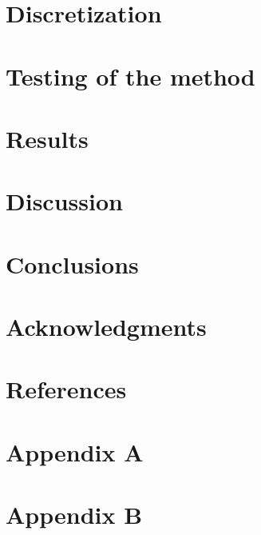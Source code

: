 \documentclass[preprint,5p,times]{elsarticle}
\begin{document}
\section{Discretization}
\section{Testing of the method}
\section{Results}
\section{Discussion}
\section{Conclusions}
\section{Acknowledgments}
\section{References}


\section{Appendix A}
\section{Appendix B}
\end{document}
